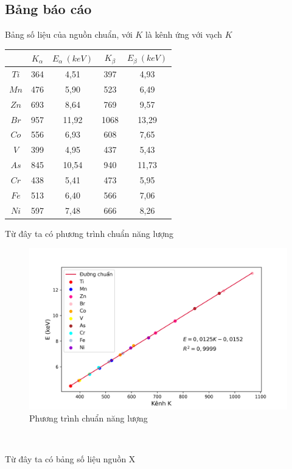 \documentclass{article}
\begin{document}
\subsection{Bảng báo cáo}
\par
Bảng số liệu của nguồn chuẩn, với $K$ là kênh ứng với vạch $K$
\begin{table}[!ht]
    \centering
    \begin{tabular}{|c|c|c|c|c|}
    \hline
        ~ & $K_\alpha$ & $E_\alpha \ (keV)$ & $K_\beta $ & $E_\beta \ (keV)$\\ \hline
        $Ti$ & 364 & 4,51 & 397 & 4,93 \\ \hline
        $Mn$ & 476 & 5,90 & 523 & 6,49 \\ \hline
        $Zn$ & 693 & 8,64 & 769 & 9,57 \\ \hline
        $Br$ & 957 & 11,92 & 1068 & 13,29 \\ \hline
        $Co$ & 556 & 6,93 & 608 & 7,65 \\ \hline
        $V$ & 399 & 4,95 & 437 & 5,43 \\ \hline
        $As$ & 845 & 10,54 & 940 & 11,73 \\ \hline
        $Cr$ & 438 & 5,41 & 473 & 5,95 \\ \hline
        $Fe$ & 513 & 6,40 & 566 & 7,06 \\ \hline
        $Ni$ & 597 & 7,48 & 666 & 8,26 \\ \hline
    \end{tabular}
\end{table}
\par
Từ đây ta có phương trình chuẩn năng lượng
\begin{figure}[h]
  \includegraphics[width=\linewidth]{plot}
  \caption{Phương trình chuẩn năng lượng}
\end{figure}
\\ \par
\newpage
Từ đây ta có bảng số liệu nguồn X
\end{document}
